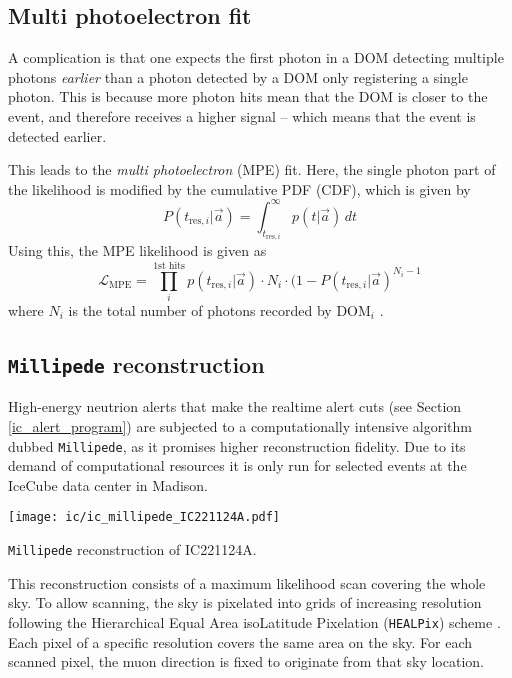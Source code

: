 \subsection{Multi photoelectron fit}
A complication is that one expects the first photon in a DOM detecting multiple photons \textit{earlier} than a photon detected by a DOM only registering a single photon. This is because more photon hits mean that the DOM is closer to the event, and therefore receives a higher signal -- which means that the event is detected earlier. 

This leads to the \textit{multi photoelectron} (MPE) fit. Here, the single photon part of the likelihood is modified by the cumulative PDF (CDF), which is given by
\begin{equation}
P(t_{\text{res},i}|\vec{a}) = \int^{\infty}_{t_{\text{res},i}}p(t|\vec{a})\,dt
\end{equation}
Using this, the MPE likelihood is given as
\begin{equation}
\mathcal{L}_\text{MPE} = \prod_i^\text{1st hits} p(t_{\text{res},i}|\vec{a}) \cdot N_i \cdot (1-P(t_{\text{res},i}|\vec{a})^{N_i-1}
\end{equation}
where $N_i$ is the total number of photons recorded by $\text{DOM}_i$ \cite{Ahrens2004}.

\subsection{\texttt{Millipede} reconstruction} \label{millipede}
High-energy neutrion alerts that make the realtime alert cuts (see Section \ref{ic_alert_program}) are subjected to a computationally intensive algorithm dubbed \texttt{Millipede}, as it promises higher reconstruction fidelity. Due to its demand of computational resources it is only run for selected events at the IceCube data center in Madison.

\begin{marginfigure}
    \texttt{[image: ic/ic\_millipede\_IC221124A.pdf]}
    \caption[\texttt{Millipede} reconstruction of IC221124A]{\texttt{Millipede} reconstruction of IC221124A.}
\end{marginfigure}

This reconstruction consists of a maximum likelihood scan covering the whole sky. To allow scanning, the sky is pixelated into grids of increasing resolution following the Hierarchical Equal Area isoLatitude Pixelation (\texttt{HEALPix}) scheme . Each pixel of a specific resolution covers the same area on the sky. For each scanned pixel, the muon direction is fixed to originate from that sky location.

